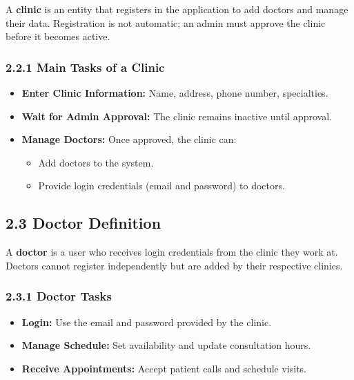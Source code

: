 \documentclass[12pt]{report}
\begin{document}
\noindent A \textbf{clinic} is an entity that registers in the application to add doctors and manage their data. Registration is not automatic; an admin must approve the clinic before it becomes active.

\subsubsection*{\textbf{2.2.1 Main Tasks of a Clinic}}
\begin{itemize}
	\item \textbf{Enter Clinic Information:} Name, address, phone number, specialties.
	\item \textbf{Wait for Admin Approval:} The clinic remains inactive until approval.
	\item \textbf{Manage Doctors:} Once approved, the clinic can:
	      \begin{itemize}
		      \item Add doctors to the system.
		      \item Provide login credentials (email and password) to doctors.
	      \end{itemize}
\end{itemize}

\vspace{0.5cm}
\subsection*{\textbf{2.3 Doctor Definition}}
\noindent A \textbf{doctor} is a user who receives login credentials from the clinic they work at. Doctors cannot register independently but are added by their respective clinics.

\subsubsection*{\textbf{2.3.1 Doctor Tasks}}
\begin{itemize}
	\item \textbf{Login:} Use the email and password provided by the clinic.
	\item \textbf{Manage Schedule:} Set availability and update consultation hours.
	\item \textbf{Receive Appointments:} Accept patient calls and schedule visits.
\end{itemize}
\end{document}
